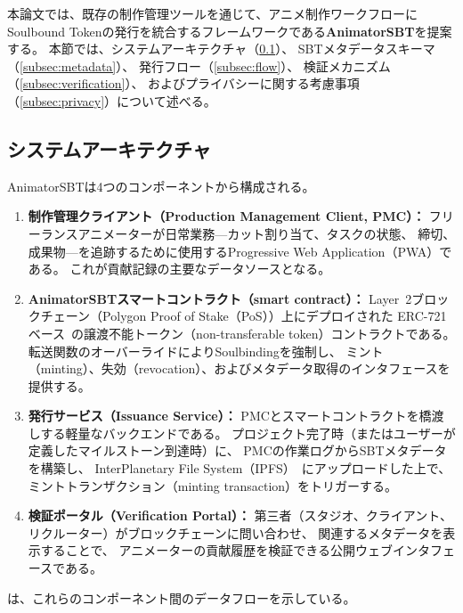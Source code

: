 
本論文では、既存の制作管理ツールを通じて、アニメ制作ワークフローに
Soulbound Tokenの発行を統合するフレームワークである\textbf{AnimatorSBT}を提案する。
本節では、システムアーキテクチャ（\cref{subsec:architecture}）、
SBTメタデータスキーマ（\cref{subsec:metadata}）、
発行フロー（\cref{subsec:flow}）、
検証メカニズム（\cref{subsec:verification}）、
およびプライバシーに関する考慮事項（\cref{subsec:privacy}）について述べる。

\subsection{システムアーキテクチャ}
\label{subsec:architecture}

AnimatorSBTは4つのコンポーネントから構成される。

\begin{enumerate}
  \item \textbf{制作管理クライアント（Production Management Client, PMC）：}
    フリーランスアニメーターが日常業務---カット割り当て、タスクの状態、
    締切、成果物---を追跡するために使用するProgressive Web Application（PWA）である。
    これが貢献記録の主要なデータソースとなる。
  \item \textbf{AnimatorSBTスマートコントラクト（smart contract）：}
    Layer~2ブロックチェーン（Polygon Proof of Stake（PoS））上にデプロイされた
    ERC-721ベース~\cite{entriken2018erc721}の譲渡不能トークン（non-transferable token）コントラクトである。
    転送関数のオーバーライドによりSoulbindingを強制し、
    ミント（minting）、失効（revocation）、およびメタデータ取得のインタフェースを提供する。
  \item \textbf{発行サービス（Issuance Service）：}
    PMCとスマートコントラクトを橋渡しする軽量なバックエンドである。
    プロジェクト完了時（またはユーザーが定義したマイルストーン到達時）に、
    PMCの作業ログからSBTメタデータを構築し、
    InterPlanetary File System（IPFS）~\cite{benet2014ipfs}にアップロードした上で、
    ミントトランザクション（minting transaction）をトリガーする。
  \item \textbf{検証ポータル（Verification Portal）：}
    第三者（スタジオ、クライアント、リクルーター）がブロックチェーンに問い合わせ、
    関連するメタデータを表示することで、
    アニメーターの貢献履歴を検証できる公開ウェブインタフェースである。
\end{enumerate}

は、これらのコンポーネント間のデータフローを示している。

